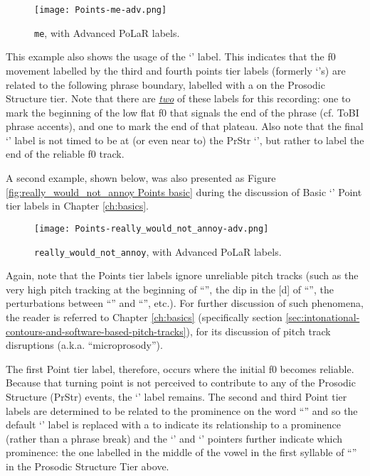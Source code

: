 \begin{figure}[H]
\centering
%
\texttt{[image: Points-me-adv.png]}
%
\caption{\texttt{me}, with Advanced PoLaR labels.%
\label{fig:me Points Adv}%
}
\end{figure}

This example also shows the usage of the ‘\textlabel{]>}’ label. This indicates that the f0 movement labelled by the third and fourth points tier labels (formerly ‘’s) are related to the following phrase boundary, labelled with a \textlabel{]} on the Prosodic Structure tier. Note that there are \textit{\uline{two}} of these labels for this recording: one to mark the beginning of the low flat f0 that signals the end of the phrase (cf. ToBI phrase accents), and one to mark the end of that plateau. Also note that the final ‘\textlabel{]>}’ label is not timed to be at (or even near to) the PrStr ‘\textlabel{]}’, but rather to label the end of the reliable f0 track.

A second example, shown below, was also presented as Figure \ref{fig:really_would_not_annoy Points basic} during the discussion of Basic ‘’ Point tier labels in Chapter \ref{ch:basics}.

\begin{figure}[H]
\centering
%
\texttt{[image: Points-really\_would\_not\_annoy-adv.png]}
%
\caption{\texttt{really\_would\_not\_annoy}, with Advanced PoLaR labels.%
\label{fig:really_would_not_annoy Points Adv}%
}
\end{figure}

Again, note that the Points tier labels ignore unreliable pitch tracks (such as the very high pitch tracking at the beginning of “”, the dip in the [d] of “”, the perturbations between “” and “”, etc.). For further discussion of such phenomena, the reader is referred to Chapter \ref{ch:basics} (specifically section \ref{sec:intonational-contours-and-software-based-pitch-tracks}), for its discussion of pitch track disruptions (a.k.a. “microprosody”).

The first Point tier label, therefore, occurs where the initial f0 becomes reliable. Because that turning point is not perceived to contribute to any of the Prosodic Structure (PrStr) events, the ‘’ label remains. The second and third Point tier labels are determined to be related to the prominence on the word “” and so the default ‘’ label is replaced with a \textlabel{*} to indicate its relationship to a prominence (rather than a phrase break) and the ‘\textlabel{>}’ and ‘\textlabel{<}’ pointers further indicate which prominence: the one labelled in the middle of the vowel in the first syllable of “” in the Prosodic Structure Tier above.

